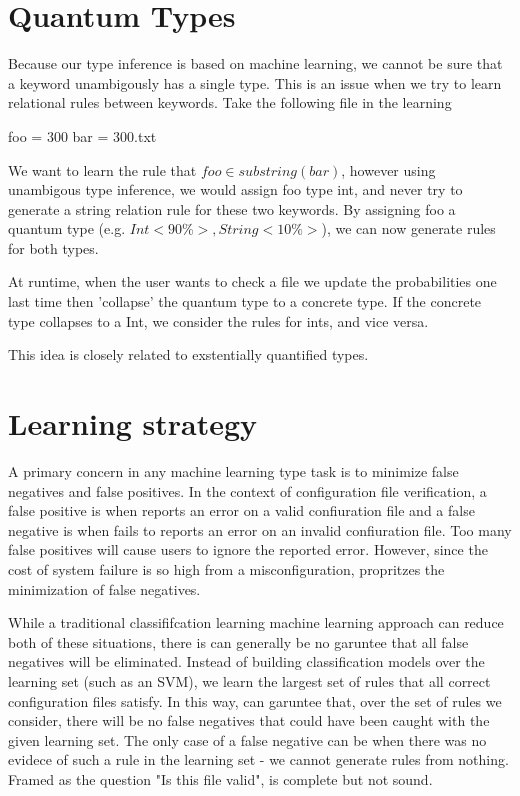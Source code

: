 
\section{Quantum Types}

Because our type inference is based on machine learning, we cannot be sure that a keyword unambigously has a single type.
This is an issue when we try to learn relational rules between keywords. 
Take the following file in the learning

foo = 300
bar = 300.txt


We want to learn the rule that $foo \in {substring(bar)}$, however using unambigous type inference, we would assign foo type int, and never try to generate a string relation rule for these two keywords.
By assigning foo a quantum type (e.g. ${Int <90\%>, String <10\%>}$), we can now generate rules for both types.

At runtime, when the user wants to check a file we update the probabilities one last time then 'collapse' the quantum type to a concrete type.
If the concrete type collapses to a Int, we consider the rules for ints, and vice versa.

This idea is closely related to exstentially quantified types.


\section{Learning strategy}

A primary concern in any machine learning type task is to minimize false negatives and false positives.
In the context of configuration file verification,
  a false positive is when \app reports an error on a valid confiuration file and
  a false negative is when \app fails to reports an error on an invalid confiuration file.
Too many false positives will cause users to ignore the reported error\cite{}.
However, since the cost of system failure is so high from a misconfiguration, \app propritzes the minimization of false negatives.

While a traditional classififcation learning machine learning approach can reduce both of these situations, there is can generally be no garuntee that all false negatives will be eliminated.
Instead of building classification models over the learning set (such as an SVM), we learn the largest set of rules that all correct configuration files satisfy.
In this way, \app can garuntee that, over the set of rules we consider, there will be no false negatives that could have been caught with the given learning set.
The only case of a false negative can be when there was no evidece of such a rule in the learning set - we cannot generate rules from nothing.
Framed as the question "Is this file valid", \app is complete but not sound. 

